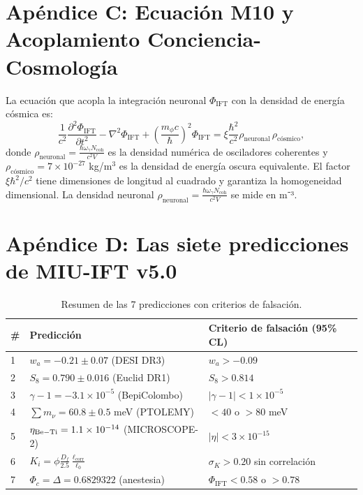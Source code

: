 \documentclass[12pt, a4paper]{article}
\theoremstyle{miuThm}
\theoremstyle{remark}
\begin{document}
\section*{Apéndice C: Ecuación M10 y Acoplamiento Conciencia-Cosmología}
\label{app:M10}
La ecuación que acopla la integración neuronal $\Phi_{\text{IFT}}$ con la densidad de energía cósmica es:
\begin{equation}
\frac{1}{c^2}\frac{\partial^2 \Phi_{\text{IFT}}}{\partial t^2} - \nabla^2 \Phi_{\text{IFT}} + \left(\frac{m_\phi c}{\hbar}\right)^2 \Phi_{\text{IFT}} = \xi \frac{\hbar^2}{c^2} \rho_{\text{neuronal}} \, \rho_{\text{cósmico}},
\end{equation}
donde $\rho_{\text{neuronal}} = \frac{\hbar \omega_\gamma N_{\text{coh}}}{c^2 V}$ es la densidad numérica de osciladores coherentes y $\rho_{\text{cósmico}} = 7\times10^{-27}$ kg/m$^3$ es la densidad de energía oscura equivalente.
El factor $\xi \hbar^2/c^2$ tiene dimensiones de longitud al cuadrado y garantiza la homogeneidad dimensional. La densidad neuronal $\rho_{\text{neuronal}} = \frac{\hbar \omega_\gamma N_{\text{coh}}}{c^2 V}$ se mide en m⁻³.
\section*{Apéndice D: Las siete predicciones de MIU-IFT v5.0}
\label{app:siete}
\begin{table}[h!]
\centering
\caption{Resumen de las 7 predicciones con criterios de falsación.}
\label{tab:siete}
\begin{tabular}{lll}
\toprule
\# & Predicción & Criterio de falsación (95\% CL) \\
\midrule
1 & $w_a = -0.21 \pm 0.07$ (DESI DR3) & $w_a > -0.09$ \\
2 & $S_8 = 0.790 \pm 0.016$ (Euclid DR1) & $S_8 > 0.814$ \\
3 & $\gamma-1 = -3.1\times10^{-5}$ (BepiColombo) & $|\gamma-1| < 1\times10^{-5}$ \\
4 & $\sum m_\nu = 60.8 \pm 0.5$ meV (PTOLEMY) & $<40$ o $>80$ meV \\
5 & $\eta_{\rm Be-Ti} = 1.1\times10^{-14}$ (MICROSCOPE-2) & $|\eta| < 3\times10^{-15}$ \\
6 & $K_i = \phi \frac{D_f}{2.5}\frac{\ell_{\text{corr}}}{\ell_0}$ & $\sigma_K > 0.20$ sin correlación \\
7 & $\Phi_c = \Delta = 0.6829322$ (anestesia) & $\Phi_{\text{IFT}} < 0.58$ o $>0.78$ \\
\bottomrule
\end{tabular}
\end{table}
\end{document}
